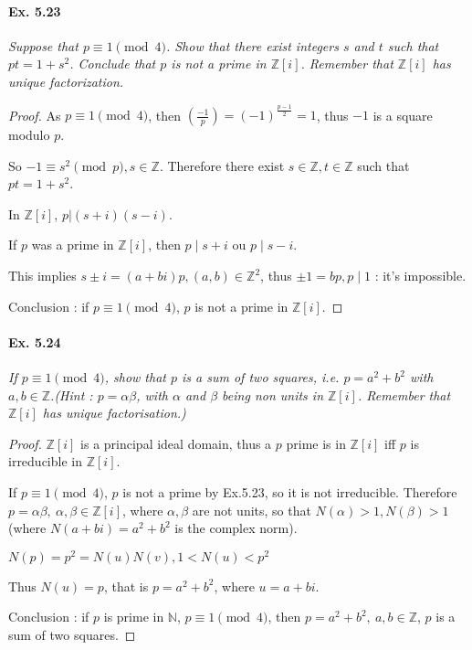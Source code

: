 \documentclass[11pt,a4paper]{article}
\newcommand{\Z}{\mathbb{Z}}
\newcommand{\legendre}[2]{\genfrac{(}{)}{}{}{#1}{#2}}
\begin{document}
\paragraph{Ex. 5.23}

{\it Suppose that $p \equiv 1 \pmod 4$. Show that there exist integers $s$ and $t$ such that $pt = 1 + s^2$.  Conclude that $p$ is not a prime in $\Z[i]$. Remember that $\Z[i]$ has unique factorization.
}

\begin{proof}
As  $p \equiv 1 \pmod 4$, then $\legendre{-1}{p} = (-1)^{\frac{p-1}{2}} = 1$, thus $-1$ is a square modulo $p$.
 
 So  $-1 \equiv s^2 \pmod p,  s \in \mathbb{Z}$. Therefore
  there exist $s \in \mathbb{Z}, t \in \mathbb{Z}$ such that $pt = 1+s^2$.
 
In $\mathbb{Z}[i]$, $p \vert (s+i)(s-i)$.

 If $p$ was a prime in $\mathbb{Z}[i]$, then  $p \mid s+i$ ou $p \mid s-i$.
  
 This implies $s \pm i = (a+bi)p, (a,b) \in \mathbb{Z}^2$, thus $\pm1 = b p , p\mid 1$ : it's impossible.
 
Conclusion : if $p \equiv 1\pmod 4$, $p$ is not a prime in  $\mathbb{Z}[i]$.
\end{proof}

\paragraph{Ex. 5.24}

{\it If $p \equiv 1 \pmod 4$, show that $p$ is a sum of two squares, i.e. $p = a^2 + b^2$ with $a, b \in \Z$.(Hint : $p = \alpha \beta$, with $ \alpha$ and $\beta$ being non units in $\Z[i]$. Remember that $\Z[i]$ has unique factorisation.)
}

\begin{proof}
$\Z[i]$ is a principal ideal domain, thus a $p$  prime is in $ \Z[i]$  iff $p$ is irreducible in $ \Z[i]$.
 
If $p \equiv 1\pmod 4$, $p$ is not a prime by Ex.5.23, so it is not irreducible. Therefore
$p = \alpha \beta, \ \alpha,\beta \in \mathbb{Z}[i]$, where $\alpha, \beta$ are not units, so that $N(\alpha)>1, N(\beta)>1$ (where $N(a+bi) = a^2 + b^2$ is the complex norm).

$N(p) = p^2=  N(u) N(v), 1 < N(u) < p^2$

Thus $N(u) = p$, that is  $p = a^2+b^2$, where $u = a+bi$.

Conclusion : if $p$ is prime in $\mathbb{N}$, $p \equiv 1\pmod 4$, then $p = a^2+b^2,\ a,b \in \Z$, $p$ is a sum of two squares.

\end{proof}
\end{document}
